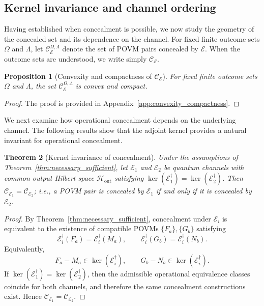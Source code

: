 \documentclass[
aps,pra,twocolumn,10pt,
superscriptaddress,longbibliography,floatfix
]{revtex4-2}
\newtheorem{theorem}{Theorem}[section]
\newtheorem{proposition}[theorem]{Proposition}
\begin{document}
\subsection{Kernel invariance and channel ordering}

Having established when concealment is possible, we now study the geometry of the concealed set and its dependence on the channel. For fixed finite outcome sets $\Omega$ and $\Lambda$, let $\mathcal C_{\mathcal E}^{\Omega,\Lambda}$ denote the set of POVM pairs concealed by $\mathcal E$. When the outcome sets are understood, we write simply $\mathcal C_{\mathcal E}$.

\begin{proposition}[Convexity and compactness of $\mathcal C_{\mathcal E}$]
\label{prop:convexity_compactness}
For fixed finite outcome sets $\Omega$ and $\Lambda$, the set $\mathcal C_{\mathcal E}^{\Omega,\Lambda}$ is convex and compact.
\end{proposition}

\begin{proof}
The proof is provided in Appendix~\ref{app:convexity_compactness}.
\end{proof}

We next examine how operational concealment depends on the underlying channel. The following results show that the adjoint kernel provides a natural invariant for operational concealment.

\begin{theorem}[Kernel invariance of concealment]
\label{thm:kernel_universality}
Under the assumptions of Theorem~\ref{thm:necessary_sufficient}, let $\mathcal{E}_1$ and $\mathcal{E}_2$ be quantum channels with common output Hilbert space $\mathcal{H}_{\mathrm{out}}$ satisfying $\ker(\mathcal{E}_1^\dagger) = \ker(\mathcal{E}_2^\dagger)$. Then $\mathcal{C}_{\mathcal{E}_1} = \mathcal{C}_{\mathcal{E}_2}$; i.e., a POVM pair is concealed by $\mathcal{E}_1$ if and only if it is concealed by $\mathcal{E}_2$.
\end{theorem}

\begin{proof}
By Theorem~\ref{thm:necessary_sufficient}, concealment under $\mathcal{E}_i$ is equivalent to the existence of compatible POVMs $\{F_a\},\{G_b\}$ satisfying
\[
\mathcal{E}_i^\dagger(F_a) = \mathcal{E}_i^\dagger(M_a), \qquad \mathcal{E}_i^\dagger(G_b) = \mathcal{E}_i^\dagger(N_b).
\]
Equivalently,
\[
F_a - M_a \in \ker(\mathcal{E}_i^\dagger), \qquad G_b - N_b \in \ker(\mathcal{E}_i^\dagger).
\]
If $\ker(\mathcal{E}_1^\dagger) = \ker(\mathcal{E}_2^\dagger)$, then the admissible operational equivalence classes coincide for both channels, and therefore the same concealment constructions exist. Hence $\mathcal{C}_{\mathcal{E}_1} = \mathcal{C}_{\mathcal{E}_2}$.
\end{proof}
\end{document}
